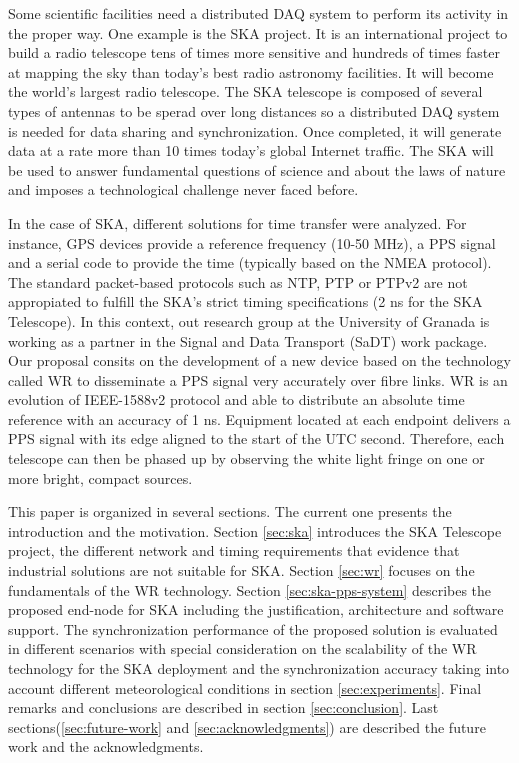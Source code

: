 Some scientific facilities need a distributed DAQ system to perform its activity in the proper way. One example is the SKA \cite{ska:project_website} project. It is an international project to build a radio telescope tens of times more sensitive and hundreds of times faster at mapping the sky than today's best radio astronomy facilities. It will become the world's largest radio telescope. The SKA telescope is composed of several types of antennas to be sperad over long distances so a distributed DAQ system is needed for data sharing and synchronization. Once completed, it will generate data at a rate more than 10 times today’s global Internet traffic. The SKA will be used to answer fundamental questions of science and about the laws of nature and imposes a technological challenge never faced before.

In the case of SKA, different solutions for time transfer were analyzed. For instance, GPS devices provide a reference frequency (10-50 MHz), a PPS signal and a serial code to provide the time (typically based on the NMEA protocol). The standard packet-based protocols such as NTP, PTP or PTPv2 are not appropiated to fulfill the SKA's strict timing specifications (2 ns for the SKA Telescope).
In this context, out research group at the University of Granada is working as a partner in the Signal and Data Transport (SaDT) \cite{ska:sadt_website} work package. Our proposal consits on the development of a new device based on the technology called WR \cite{ohwr:wr_wiki} to disseminate a PPS signal very accurately over fibre links. WR is an evolution of IEEE-1588v2 protocol and able to distribute an absolute time reference with an accuracy of 1 ns. Equipment located at each endpoint delivers a PPS signal with its edge aligned to the start of the UTC second. Therefore, each telescope can then be phased up by observing the white light fringe on one or more bright, compact sources.

This paper is organized in several sections. The current one 
presents the introduction and the motivation. Section \ref{sec:ska} introduces the SKA Telescope project, the different network and timing requirements that evidence that industrial solutions are not suitable for SKA. Section \ref{sec:wr} focuses on the fundamentals of the WR technology. Section \ref{sec:ska-pps-system} describes the proposed end-node for SKA including the justification, architecture and software support. The synchronization performance of the proposed solution is evaluated in different scenarios with special consideration on the scalability of the WR technology for the SKA deployment and the synchronization accuracy taking into account different meteorological conditions in section \ref{sec:experiments}. Final remarks and conclusions are described in section \ref{sec:conclusion}. Last sections(\ref{sec:future-work} and \ref{sec:acknowledgments}) are described the future work and the acknowledgments.


